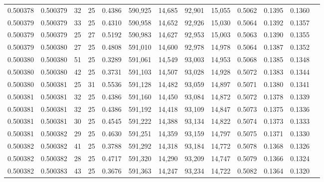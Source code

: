 \begin{tabular}{rrrrrrrrrrrrr}
0.500378 & 0.500379 &    32 &  25 &                                     0.4386 & 590,925 &  14,685 &  92,901 &  15,055 & 0.5062 & 0.1395 & 0.1360 \\
0.500379 & 0.500379 &    33 &  25 &                                     0.4310 & 590,958 &  14,652 &  92,926 &  15,030 & 0.5064 & 0.1392 & 0.1357 \\
0.500379 & 0.500379 &    25 &  27 &                                     0.5192 & 590,983 &  14,627 &  92,953 &  15,003 & 0.5063 & 0.1390 & 0.1355 \\
0.500379 & 0.500380 &    27 &  25 &                                     0.4808 & 591,010 &  14,600 &  92,978 &  14,978 & 0.5064 & 0.1387 & 0.1352 \\
0.500380 & 0.500380 &    51 &  25 &                                     0.3289 & 591,061 &  14,549 &  93,003 &  14,953 & 0.5068 & 0.1385 & 0.1348 \\
0.500380 & 0.500380 &    42 &  25 &                                     0.3731 & 591,103 &  14,507 &  93,028 &  14,928 & 0.5072 & 0.1383 & 0.1344 \\
0.500380 & 0.500381 &    25 &  31 &                                     0.5536 & 591,128 &  14,482 &  93,059 &  14,897 & 0.5071 & 0.1380 & 0.1341 \\
0.500381 & 0.500381 &    32 &  25 &                                     0.4386 & 591,160 &  14,450 &  93,084 &  14,872 & 0.5072 & 0.1378 & 0.1339 \\
0.500381 & 0.500381 &    32 &  25 &                                     0.4386 & 591,192 &  14,418 &  93,109 &  14,847 & 0.5073 & 0.1375 & 0.1336 \\
0.500381 & 0.500381 &    30 &  25 &                                     0.4545 & 591,222 &  14,388 &  93,134 &  14,822 & 0.5074 & 0.1373 & 0.1333 \\
0.500381 & 0.500382 &    29 &  25 &                                     0.4630 & 591,251 &  14,359 &  93,159 &  14,797 & 0.5075 & 0.1371 & 0.1330 \\
0.500382 & 0.500382 &    41 &  25 &                                     0.3788 & 591,292 &  14,318 &  93,184 &  14,772 & 0.5078 & 0.1368 & 0.1326 \\
0.500382 & 0.500382 &    28 &  25 &                                     0.4717 & 591,320 &  14,290 &  93,209 &  14,747 & 0.5079 & 0.1366 & 0.1324 \\
0.500382 & 0.500383 &    43 &  25 &                                     0.3676 & 591,363 &  14,247 &  93,234 &  14,722 & 0.5082 & 0.1364 & 0.1320 \\

\end{tabular}

